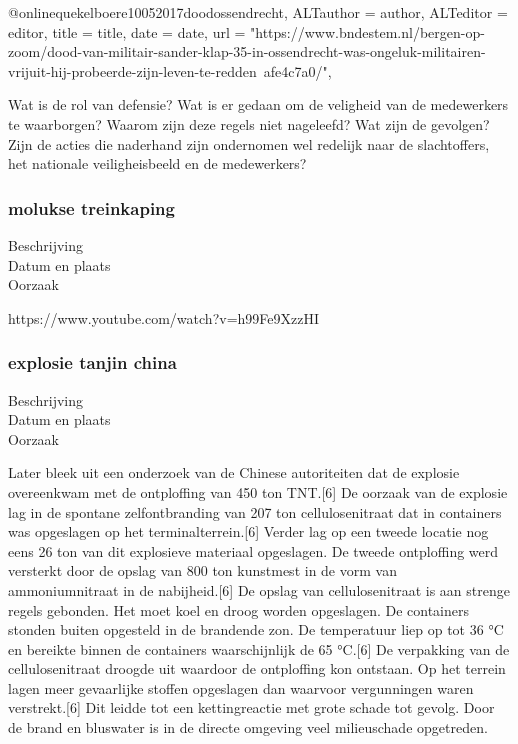 {{@online{quekelboere10052017doodossendrecht,	ALTauthor = {author},	ALTeditor = {editor},	title = {title},	date = {date},	url = {"https://www.bndestem.nl/bergen-op-zoom/dood-van-militair-sander-klap-35-in-ossendrecht-was-ongeluk-militairen-vrijuit-hij-probeerde-zijn-leven-te-redden~afe4c7a0/"},}


Wat is de rol van defensie?
Wat is er gedaan om de veligheid van de medewerkers te waarborgen?
Waarom zijn deze regels niet nageleefd?
Wat zijn de gevolgen?
Zijn de acties die naderhand zijn ondernomen wel redelijk naar de slachtoffers, het nationale veiligheisbeeld en de medewerkers?



\subsubsection{molukse treinkaping }

\begin{description}
\item[Beschrijving]
\item[Datum en plaats] 
\item[Oorzaak]
\end{description}
https://www.youtube.com/watch?v=h99Fe9XzzHI 
\cite{molukseTreinkaping}
\subsubsection{explosie tanjin china }

\begin{description}
	\item[Beschrijving]
	\item[Datum en plaats] 
	\item[Oorzaak]
\end{description}

Later bleek uit een onderzoek van de Chinese autoriteiten dat de explosie overeenkwam met de ontploffing van 450 ton TNT.[6] 
De oorzaak van de explosie lag in de spontane zelfontbranding van 207 ton cellulosenitraat dat in containers was opgeslagen op het terminalterrein.[6] 
Verder lag op een tweede locatie nog eens 26 ton van dit explosieve materiaal opgeslagen.
De tweede ontploffing werd versterkt door de opslag van 800 ton kunstmest in de vorm van ammoniumnitraat in de nabijheid.[6]
De opslag van cellulosenitraat is aan strenge regels gebonden. Het moet koel en droog worden opgeslagen. De containers stonden buiten opgesteld in de brandende zon. De temperatuur liep op tot 36 °C en bereikte binnen de containers waarschijnlijk de 65 °C.[6] De verpakking van de cellulosenitraat droogde uit waardoor de ontploffing kon ontstaan. Op het terrein lagen meer gevaarlijke stoffen opgeslagen dan waarvoor vergunningen waren verstrekt.[6] Dit leidde tot een kettingreactie met grote schade tot gevolg. Door de brand en bluswater is in de directe omgeving veel milieuschade opgetreden.


}}
